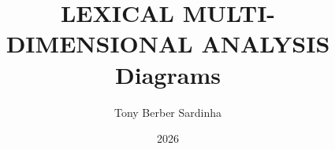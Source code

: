 \title{
    \LARGE \MakeUppercase{Lexical Multi-Dimensional Analysis} \\
    \Large Diagrams
}
\author{Tony Berber Sardinha} %
\date{2026}
\maketitle
